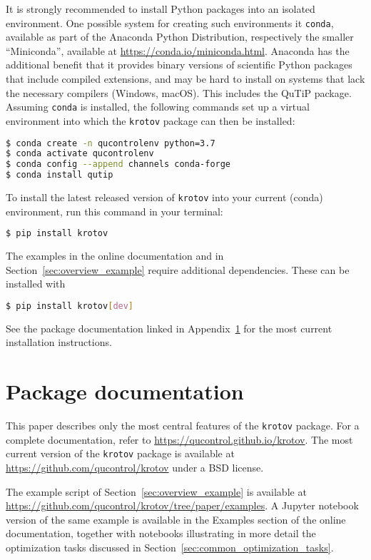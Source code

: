\documentclass[submission, Phys]{SciPost}
\begin{document}
It is strongly recommended to install Python packages into an isolated
environment.
One possible system for creating such environments it \texttt{conda}, available
as part of the Anaconda Python Distribution, respectively the smaller
``Miniconda'', available at \url{https://conda.io/miniconda.html}.
Anaconda has the additional benefit that it provides binary versions of
scientific Python packages that include compiled extensions, and may be hard to
install on systems that lack the necessary compilers (Windows, macOS). This
includes the QuTiP package.
Assuming \texttt{conda} is installed, the following commands set up a virtual
environment into which the {\tt krotov} package can then be installed:
\begin{lstlisting}[language=bash]
$ conda create -n qucontrolenv python=3.7
$ conda activate qucontrolenv
$ conda config --append channels conda-forge
$ conda install qutip
\end{lstlisting}
To install the latest released version of \texttt{krotov} into your current
(conda) environment, run this command in your terminal:
\begin{lstlisting}[language=bash]
$ pip install krotov
\end{lstlisting}
%
The examples in the online documentation and in
Section~\ref{sec:overview_example} require additional dependencies.
These can be installed with
\begin{lstlisting}[language=bash]
$ pip install krotov[dev]
\end{lstlisting}
%
See the package documentation linked in Appendix~\ref{apx:package_docs} for the
most current installation instructions.


\section{Package documentation}%
\label{apx:package_docs}

This paper describes only the most central features of the \texttt{krotov}
package.
For a complete documentation, refer to \url{https://qucontrol.github.io/krotov}.
The most current version of the \texttt{krotov} package is available at
\url{https://github.com/qucontrol/krotov} under a BSD license.

The example script of Section~\ref{sec:overview_example} is available at
\url{https://github.com/qucontrol/krotov/tree/paper/examples}.
A Jupyter notebook version of the same example is available in
the Examples section of the online documentation, together with notebooks
illustrating in more detail the optimization tasks discussed in
Section~\ref{sec:common_optimization_tasks}.

\nolinenumbers


\end{document}
